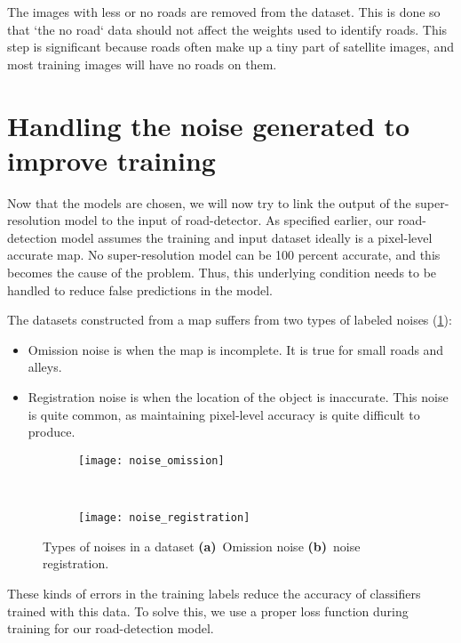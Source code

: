 The images with less or no roads are removed from the dataset. This is done so that `the no road` data should not affect the weights used to identify roads. This step is significant because roads often make up a tiny part of satellite images, and most training images will have no roads on them.


\section{Handling the noise generated to improve training}
Now that the models are chosen, we will now try to link the output of the super-resolution model to the input of road-detector. As specified earlier, our road-detection model assumes the training and input dataset ideally is a pixel-level accurate map. No super-resolution model can be 100 percent accurate, and this becomes the cause of the problem. Thus, this underlying condition needs to be handled to reduce false predictions in the model.

The datasets constructed from a map suffers from two types of labeled noises (\cref{fig:noise_types}):
\begin{itemize}
  \setlength\itemsep{1mm}
  \item Omission noise is when the map is incomplete. It is true for small roads and alleys.
  \item Registration noise is when the location of the object is inaccurate. This noise is quite common, as maintaining pixel-level accuracy is quite difficult to produce.
\end{itemize}

\begin{figure}[h!]
  \centering
  \begin{subfigure}{0.63\textwidth}
    \texttt{[image: noise\_omission]}
    \caption{}
  \end{subfigure}~
  \begin{subfigure}{0.35\textwidth}
    \texttt{[image: noise\_registration]}
    \caption{}
  \end{subfigure}
  \caption[Types of noises in a dataset]{Types of noises in a dataset \textbf{(a)}~Omission noise \textbf{(b)}~noise registration.}
  \label{fig:noise_types}
\end{figure}

These kinds of errors in the training labels reduce the accuracy of classifiers trained with this data. To solve this, we use a proper loss function during training for our road-detection model.
